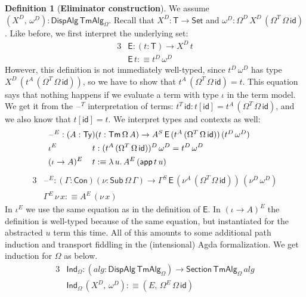 \documentclass[12pt,a4paper,twoside,openany]{book}
\theoremstyle{remark}
\theoremstyle{definition}
\newtheorem{mydefinition}{Definition}
\theoremstyle{theorem}
\newcommand{\mi}[1]{\mathit{#1}}
\newcommand{\ms}[1]{\mathsf{#1}}
\newcommand{\id}{\mathsf{id}}
\newcommand{\Con}{\mathsf{Con}}
\newcommand{\Sub}{\mathsf{Sub}}
\newcommand{\Tm}{\mathsf{Tm}}
\newcommand{\Ty}{\mathsf{Ty}}
\newcommand{\blank}{\mathord{\hspace{1pt}\text{--}\hspace{1pt}}}
\newcommand{\Set}{\mathsf{Set}}
\newcommand{\app}{\ms{app}}
\newcommand{\DispAlg}{\ms{DispAlg}}
\newcommand{\Section}{\ms{Section}}
\newcommand{\TmAlg}{\ms{TmAlg}}
\newcommand{\Ind}{\ms{Ind}}
\newcommand{\defn}{:\equiv}
\begin{document}
\begin{mydefinition}[\textbf{Eliminator construction}]\label{def:simple-eliminator-construction}
We assume $(X^D,\,\omega^D) : \DispAlg\,\TmAlg_\Omega$. Recall that $X^D :
\ms{T} \to \Set$ and $\omega^D : \Omega^D\,X^D\,(\Omega^T\,\Omega\,\id)$. Like
before, we first interpret the underlying set:
\begin{alignat*}{3}
  & \ms{E} : (t : \ms{T}) \to X^D\,t \\
  & \ms{E}\,t \defn t^D\,\omega^D
\end{alignat*}
However, this definition is not immediately well-typed, since $t^D\,\omega^D$
has type $X^D\,(t^A\,(\Omega^T\,\Omega\,\id))$, so we have to show that
$t^A\,(\Omega^T\,\Omega\,\id) = t$. This equation says that nothing happens if
we evaluate a term with type $\iota$ in the term model. We get it from the
$\blank^T$ interpretation of terms: $t^T\,\id : t[\id] =
t^A\,(\Omega^T\,\Omega\,\id)$, and we also know that $t[\id] = t$. We interpret types
and contexts as well:
\begin{alignat*}{3}
  & \hspace{-6em}\rlap{$\blank^E : (A : \Ty)(t : \Tm\,\Omega\,A) \to A^S\,\ms{E}\,(t^A\,(\Omega^T\,\Omega\,\id))\,(t^D\,\omega^D)$}\\
  & \hspace{-6em}\iota^E\,&&t : (t^A\,(\Omega^T\,\Omega\,\id))^D\,\omega^D = t^D\,\omega^D\\
  & \hspace{-6em}(\iota\to A)^E\,&&t \defn \lambda\,u.\, A^E\,(\app\,t\,u)
\end{alignat*}
\begin{alignat*}{3}
  & \blank^E : (\Gamma : \Con)(\nu : \Sub\,\Omega\,\Gamma) \to \Gamma^S\,\ms{E}\,(\nu^A\,(\Omega^T\,\Omega\,\id))\, (\nu^D\,\omega^D)\\
  & \Gamma^E\,\nu\,x \defn A^E\,(\nu\,x)
\end{alignat*}
In $\iota^E$ we use the same equation as in the definition of $\ms{E}$. In
$(\iota\to A)^E$ the definition is well-typed because of the same equation, but
instantiated for the abstracted $u$ term this time. All of this amounts to some
additional path induction and transport fiddling in the (intensional) Agda
formalization. We get induction for $\Omega$ as below.
\begin{alignat*}{3}
  &\Ind_{\Omega} : (\mi{alg} : \DispAlg\,\TmAlg_\Omega) \to \Section\,\TmAlg_\Omega\,\mi{alg}\\
  &\Ind_{\Omega}\,(X^D,\,\omega^D) \defn (E,\, \Omega^E\,\Omega\,\id)
\end{alignat*}
\end{mydefinition}
\end{document}
